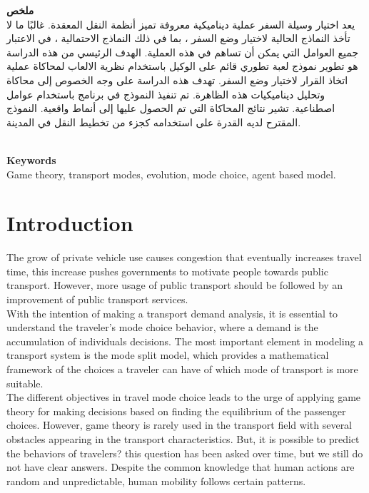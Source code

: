 \documentclass[12pt]{report}
\begin{document}
\begin{center}
   \begin{otherlanguage}{arabic}
   \textbf{ملخص}\\
 \vspace{0.2cm}
يعد اختيار وسيلة السفر عملية ديناميكية معروفة تميز أنظمة النقل المعقدة. غالبًا ما لا تأخذ النماذج الحالية لاختيار وضع السفر ، بما في ذلك النماذج الاحتمالية ، في الاعتبار جميع العوامل التي يمكن أن تساهم في هذه العملية. الهدف الرئيسي من هذه الدراسة هو تطوير نموذج لعبة تطوري قائم على الوكيل باستخدام نظرية الالعاب لمحاكاة عملية اتخاذ القرار لاختيار وضع السفر. تهدف هذه الدراسة على وجه الخصوص إلى محاكاة وتحليل ديناميكيات هذه الظاهرة. تم تنفيذ النموذج في برنامج   باستخدام عوامل اصطناعية. تشير نتائج المحاكاة التي تم الحصول عليها إلى أنماط واقعية. النموذج المقترح لديه القدرة على استخدامه كجزء من تخطيط النقل في المدينة. 
\end{otherlanguage}
\\
\vspace{0.2cm}
\textbf{Keywords}\\
\vspace{0.2cm}
Game theory, transport modes, evolution, mode choice, agent based model.

\end{center}


\tableofcontents
\listoffigures
\listoftables


\clearpage


\chapter*{Introduction}
\setcounter{page}{1}
The grow of private vehicle use causes congestion that eventually  increases travel time, this increase pushes governments to motivate people towards public transport. However, more usage of public transport should be followed by an improvement of public transport services.\\

With the intention of making a transport demand analysis, it is essential to understand the traveler's mode choice behavior, where a demand is the accumulation of individuals decisions. The most important element in modeling a transport system is the mode split model, which provides a mathematical framework of the choices a traveler can have of which mode of transport is more suitable.\\

The different objectives in travel mode choice leads to the urge of applying game theory for making decisions based on finding the equilibrium of the passenger choices. However, game theory is rarely used in the transport field with several obstacles appearing in the transport characteristics. But, it is possible to predict the behaviors of travelers? this question has been asked over time, but we still do not have clear answers. Despite the common knowledge that human actions are random and unpredictable, human mobility follows certain patterns.\\
\end{document}

